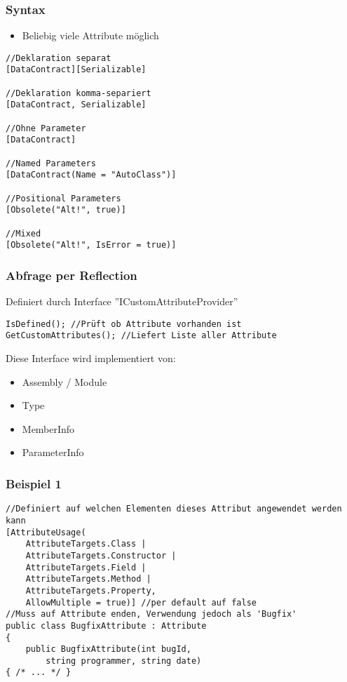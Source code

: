 \begin{multicols*}{2}
\subsubsection{Syntax}
\begin{itemize}
    \item Beliebig viele Attribute möglich
\end{itemize}
\begin{lstlisting}
//Deklaration separat
[DataContract][Serializable]

//Deklaration komma-separiert
[DataContract, Serializable]

//Ohne Parameter
[DataContract]

//Named Parameters
[DataContract(Name = "AutoClass")]

//Positional Parameters
[Obsolete("Alt!", true)]

//Mixed
[Obsolete("Alt!", IsError = true)]
\end{lstlisting}

\subsubsection{Abfrage per Reflection}
Definiert durch Interface ''ICustomAttributeProvider''
\begin{lstlisting}
IsDefined(); //Prüft ob Attribute vorhanden ist
GetCustomAttributes(); //Liefert Liste aller Attribute
\end{lstlisting}
Diese Interface wird implementiert von:
\begin{itemize}
    \item Assembly / Module
    \item Type
    \item MemberInfo
    \item ParameterInfo
\end{itemize}
\subsubsection{Beispiel 1}
\begin{lstlisting}
//Definiert auf welchen Elementen dieses Attribut angewendet werden kann
[AttributeUsage( 
    AttributeTargets.Class | 
    AttributeTargets.Constructor | 
    AttributeTargets.Field | 
    AttributeTargets.Method | 
    AttributeTargets.Property, 
    AllowMultiple = true)] //per default auf false 
//Muss auf Attribute enden, Verwendung jedoch als 'Bugfix'
public class BugfixAttribute : Attribute
{
    public BugfixAttribute(int bugId,
        string programmer, string date)
{ /* ... */ }


\end{lstlisting}
\end{multicols*}
